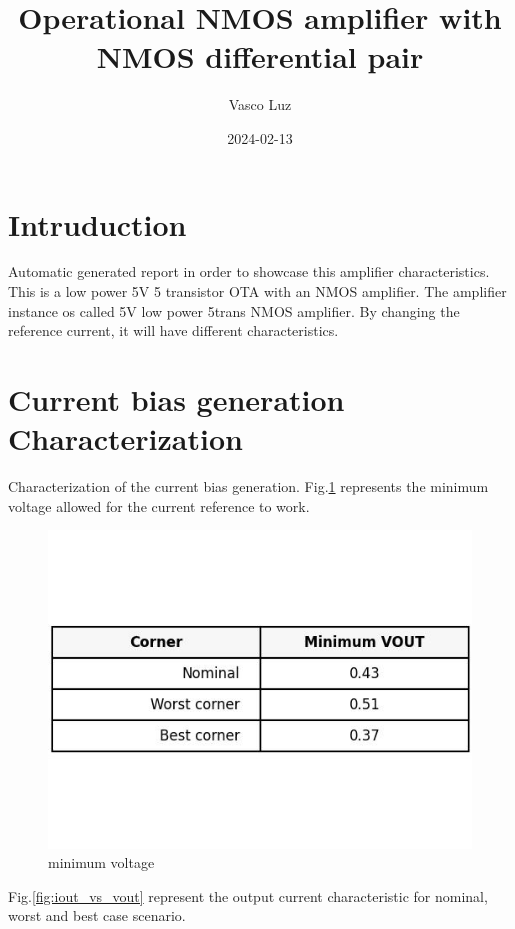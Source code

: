 \documentclass{article}
\begin{document}
\title{Operational NMOS amplifier with NMOS differential pair}
\author{Vasco Luz} %
\date{2024-02-13} %
\maketitle
\justify

\section{Intruduction}


Automatic generated report in order to showcase this amplifier characteristics.
\newline
This is a low power 5V 5 transistor OTA with an NMOS amplifier.
\newline
The amplifier instance os called 5V low power 5trans NMOS amplifier.
\newline
By changing the reference current, it will have different characteristics.

\section{Current bias generation Characterization}

Characterization of the current bias generation.
\newline
Fig.\ref{fig:values} represents the minimum voltage allowed for the current reference to work.
\begin{figure}[H] %
    \centering
    \includegraphics[width=.6\textwidth]{./interception_table.jpg} %
    \caption{minimum voltage}\label{fig:values}
\end{figure}



Fig.\ref{fig:iout_vs_vout} represent the output current characteristic for nominal, worst and best case scenario.
\end{document}
